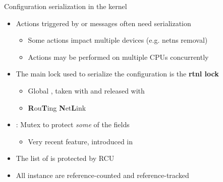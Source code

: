 \begin{frame}{Configuration serialization in the kernel}
	\begin{itemize}
		\item Actions triggered by  or  messages often need serialization
			\begin{itemize}
				\item Some actions impact multiple devices (e.g. netns removal)
				\item Actions may be performed on multiple CPUs concurrently
			\end{itemize}
		\item The main lock used to serialize the configuration is the \textbf{rtnl lock}
			\begin{itemize}
				\item Global , taken with  and released with 
				\item \textbf{R}ou\textbf{T}ing \textbf{N}et\textbf{L}ink
			\end{itemize}
		\item {} : Mutex to protect \textit{some} of the  fields
			\begin{itemize}
				\item Very recent feature, introduced in 
			\end{itemize}
		\item The list of  is protected by RCU
		\item All  instance are reference-counted and reference-tracked
	\end{itemize}
\end{frame}

